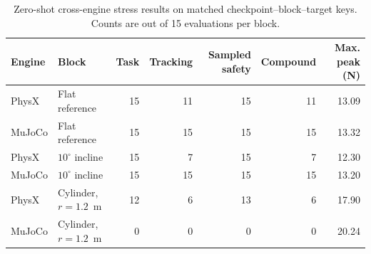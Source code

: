 \begin{table}[t]
\centering
\caption{Zero-shot cross-engine stress results on matched checkpoint--block--target keys. Counts are out of 15 evaluations per block.}
\label{tab:cross_engine_transfer}
\scriptsize
\setlength{\tabcolsep}{5pt}
\renewcommand{\arraystretch}{0.95}
\begin{tabular}{@{}llrrrrr@{}}
\toprule
Engine & Block & Task & Tracking & Sampled safety & Compound & Max. peak (N) \\
\midrule
PhysX  & Flat reference       & 15 & 11 & 15 & 11 & 13.09 \\
MuJoCo & Flat reference       & 15 & 15 & 15 & 15 & 13.32 \\
PhysX  & $10^\circ$ incline  & 15 &  7 & 15 &  7 & 12.30 \\
MuJoCo & $10^\circ$ incline  & 15 & 15 & 15 & 15 & 13.20 \\
PhysX  & Cylinder, $r=1.2$~m & 12 &  6 & 13 &  6 & 17.90 \\
MuJoCo & Cylinder, $r=1.2$~m &  0 &  0 &  0 &  0 & 20.24 \\
\bottomrule
\end{tabular}
\end{table}

